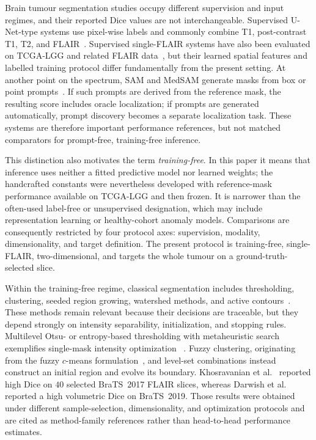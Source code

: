 \documentclass[11pt,a4paper]{article}
\begin{document}
Brain tumour segmentation studies occupy different supervision and input
regimes, and their reported Dice values are not interchangeable. Supervised
U-Net-type systems use pixel-wise labels and commonly combine T1, post-contrast
T1, T2, and FLAIR~\cite{havaei2017,isensee2021,bakas2019}. Supervised
single-FLAIR systems have also been evaluated on TCGA-LGG and related FLAIR
data~\cite{buda2019,soltaninejad2017}, but their learned spatial
features and labelled training protocol differ fundamentally from the present
setting. At another point on the spectrum, SAM and MedSAM generate masks from
box or point prompts~\cite{kirillov2023sam,ma2024medsam}. If such prompts are
derived from the reference mask, the resulting score includes oracle
localization; if prompts are generated automatically, prompt discovery becomes a
separate localization task. These systems are therefore important performance
references, but not matched comparators for prompt-free, training-free inference.

This distinction also motivates the term \emph{training-free}. In this paper it
means that inference uses neither a fitted predictive model nor learned weights;
the handcrafted constants were nevertheless developed with reference-mask
performance available on TCGA-LGG and then frozen. It is narrower than the
often-used label-free or unsupervised designation, which may include
representation learning or healthy-cohort anomaly models. Comparisons are consequently restricted by
four protocol axes: supervision, modality, dimensionality, and target definition.
The present protocol is training-free, single-FLAIR, two-dimensional, and targets
the whole tumour on a ground-truth-selected slice.

Within the training-free regime, classical segmentation includes thresholding, clustering, seeded
region growing, watershed methods, and active contours~\cite{gordillo2013,
mohammed2023survey}. These methods remain relevant because their decisions are
traceable, but they depend strongly on intensity separability, initialization,
and stopping rules. Multilevel Otsu- or entropy-based thresholding with
metaheuristic search exemplifies single-mask intensity optimization
~\cite{kotte2018}. Fuzzy clustering, originating from the fuzzy
$c$-means formulation~\cite{bezdek1981}, and level-set combinations instead construct
an initial region and evolve its boundary. Khosravanian et al.~\cite{khosravanian2021}
reported high Dice on $40$ selected BraTS~2017 FLAIR slices, whereas Darwish et
al.~\cite{darwish2023} reported a high volumetric Dice on BraTS~2019. Those
results were obtained under different sample-selection, dimensionality, and
optimization protocols and are cited as method-family references rather than
head-to-head performance estimates.
\end{document}
